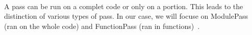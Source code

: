 \documentclass{article}
\begin{document}
\begin{itemize}
\paragraph{}
A pass can be run on a complet code or only on a portion. This leads to the distinction of various types of pass. In our case, we will focuse on ModulePass (ran on the whole code) and FunctionPass (ran in functions)~\cite{LLVM:CGO04}.

\begin{comment}
\paragraph{}
What better than an example to illustrate how to implement and use a pass !\\

\subsubsection{2.2.1~~~~~~~LLVM Pass Example: Counting Machine Operations}
\begin{lstlisting}[language=Java, caption=Machine operation counting example, basicstyle=\scriptsize]
struct CountOp:public FunctionPass 
  {
    std::map<std::string, int> opCounter; 
    static char ID; CountOp() : FunctionPass(ID) {} 
    virtual bool runOnFunction(Function &F) 
    { 
      errs() << "Function " << F.getName() << "\n"; 
      for (Function::iterator bb = F.begin(), e = F.end(); 
      bb != e; ++bb) 
      {
        //errs() << "Name : " << bb.getName();
        for (BasicBlock::iterator i = bb->begin(), 
          e = bb->end(); i != e; ++i)
        {
          if(opCounter.find(i->getOpcodeName()) == 
            opCounter.end()) 
          {
            opCounter[i->getOpcodeName()] = 1; 
          } 
          else 
          {
            opCounter[i->getOpcodeName()] += 1; 
          }
          errs() << "\n";
        } 
      } 
      std::map <std::string, int>::iterator i = opCounter.begin(); 
      std::map <std::string, int>::iterator e = opCounter.end(); 
      while (i != e) 
      { 
        errs() << i->first << ": " << i->second << "\n"; i++; 
      } 
      errs() << "\n"; opCounter.clear(); return false;
     } 
  };
\end{lstlisting}


\end{comment}
\end{itemize}
\end{document}
